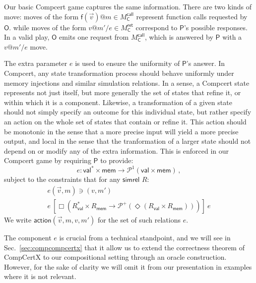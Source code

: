 \documentclass[acmsmall,anonymous]{acmart}
\makeatletter
\newcommand{\kw}[1]{\ensuremath{ \textsf{#1} }}
\newcommand{\ifr}[1]{\ [{#1}]\ }
\newcommand{\EC}{\kw{C}}
\newcommand{\simrel}{\kw{simrel}}
\newcommand{\mcall}[3]{\kw{#1}({#2})@{#3}}
\newcommand{\mretx}[3]{{#1}@{#2}/{#3}}
\makeatother
\begin{document}
Our basic Compcert game
captures the same information.
There are two kinds of move:
moves of the form
$\mcall{f}{\vec{v}}{m} \in M_\EC^\kw{call}$
represent function calls requested by \kw{O}.
while moves of the form
$\mretx{v}{m'}{e} \in M_\EC^\kw{ret}$
correspond to \kw{P}'s possible responses.
In a valid play,
\kw{O} emits one request from $M_\EC^\kw{call}$,
which is answered by \kw{P} with a $\mretx{v}{m'}{e}$ move.

The extra parameter $e$
is used to ensure the uniformity of \kw{P}'s answer.
In Compcert,
any state transformation process should behave uniformly
under memory injections and similar simulation relations.
In a sense,
a Compcert state represents not just itself,
but more generally the set of states that refine it,
or within which it is a component.
Likewise,
a transformation of a given state
should not simply specify an outcome for this individual state,
but rather specify an action on the whole set of states that contain or refine it.
This action should be monotonic
in the sense that a more precise input will yield a more precise output,
and local in the sense that the tranformation of a larger state
should not depend on or modify any of the extra information.
This is enforced in our Compcert game by requiring \kw{P}
to provide:
\[ e : \kw{val}^* \times \kw{mem} \rightarrow \mathcal{P}^1(\kw{val} \times \kw{mem}) \,, \]
subject to the constraints that for any \simrel{} $R$:
\begin{gather*}
  e(\vec{v}, m) \ni (v, m') \\
  e \ifr{\Box (R_\kw{val}^* \times R_\kw{mem} \rightarrow
         \mathcal{P}^+(\Diamond (R_\kw{val} \times R_\kw{mem})))} e
\end{gather*}
We write $\kw{action}(\vec{v}, m, v, m')$
for the set of such relations $e$.

The component $e$ is crucial from a technical standpoint,
and we will see in Sec.~\ref{sec:compcompcertx}
that it allow us to extend the correctness theorem of CompCertX
to our compositional setting
through an oracle construction.
However, for the sake of clarity
we will omit it from our presentation
in examples where it is not relevant.
\end{document}
